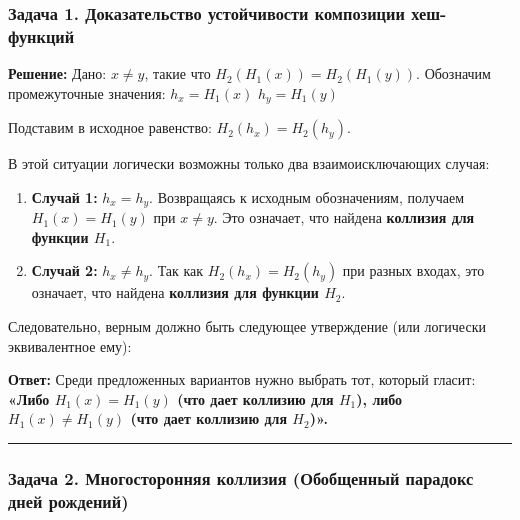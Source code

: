 \subsubsection{Задача 1. Доказательство устойчивости композиции хеш-функций}\label{ux437ux430ux434ux430ux447ux430-1.-ux434ux43eux43aux430ux437ux430ux442ux435ux43bux44cux441ux442ux432ux43e-ux443ux441ux442ux43eux439ux447ux438ux432ux43eux441ux442ux438-ux43aux43eux43cux43fux43eux437ux438ux446ux438ux438-ux445ux435ux448-ux444ux443ux43dux43aux446ux438ux439}

\textbf{Решение:} Дано: \(x \neq y\), такие что \(H_2(H_1(x)) = H_2(H_1(y))\). Обозначим промежуточные значения: \(h_x = H_1(x)\) \(h_y = H_1(y)\)

Подставим в исходное равенство: \(H_2(h_x) = H_2(h_y)\).

В этой ситуации логически возможны только два взаимоисключающих случая:

\begin{enumerate}
\def\labelenumi{\arabic{enumi}.}
\tightlist
\item
  \textbf{Случай 1:} \(h_x = h_y\). Возвращаясь к исходным обозначениям, получаем \(H_1(x) = H_1(y)\) при \(x \neq y\). Это означает, что найдена \textbf{коллизия для функции \(H_1\)}.
\item
  \textbf{Случай 2:} \(h_x \neq h_y\). Так как \(H_2(h_x) = H_2(h_y)\) при разных входах, это означает, что найдена \textbf{коллизия для функции \(H_2\)}.
\end{enumerate}

Следовательно, верным должно быть следующее утверждение (или логически эквивалентное ему):

\textbf{Ответ:} Среди предложенных вариантов нужно выбрать тот, который гласит: \textbf{«Либо \(H_1(x) = H_1(y)\) (что дает коллизию для \(H_1\)), либо \(H_1(x) \neq H_1(y)\) (что дает коллизию для \(H_2\))».}

\begin{center}\rule{0.5\linewidth}{0.5pt}\end{center}

\subsubsection{Задача 2. Многосторонняя коллизия (Обобщенный парадокс дней рождений)}\label{ux437ux430ux434ux430ux447ux430-2.-ux43cux43dux43eux433ux43eux441ux442ux43eux440ux43eux43dux43dux44fux44f-ux43aux43eux43bux43bux438ux437ux438ux44f-ux43eux431ux43eux431ux449ux435ux43dux43dux44bux439-ux43fux430ux440ux430ux434ux43eux43aux441-ux434ux43dux435ux439-ux440ux43eux436ux434ux435ux43dux438ux439}

